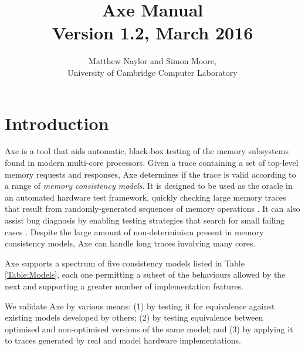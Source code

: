\documentclass[11pt]{article}
\begin{document}
\title{\textbf{Axe Manual}\\ {\large Version 1.2, March 2016}}
\author{Matthew Naylor and Simon Moore, \\
University of Cambridge Computer Laboratory}
\date{}
\maketitle

\tableofcontents

\newpage

\setlength{\parskip}{1em}
\renewcommand{\thefootnote}{\fnsymbol{footnote}}

\newcommand{\cmark}{\ding{51}}
\newcommand{\xmark}{\ding{55}}

\section{Introduction}

Axe is a tool that aids automatic, black-box testing of the
memory subsystems found in modern multi-core processors.  Given a
trace containing a set of top-level memory requests and responses, Axe
determines if the trace is valid according to a range of \emph{memory
consistency models}.  It is designed to be used as the oracle in an
automated hardware test framework, quickly checking large memory
traces that result from randomly-generated sequences of memory
operations \cite{BlueCheck}.
It can also assist bug diagnosis by enabling
testing strategies that search
for small failing cases \cite{BlueCheck}.
Despite
the large amount of non-determinism present in memory consistency
models, Axe can handle long traces involving many cores.

Axe supports a spectrum of five consistency models listed in Table
\ref{Table:Models}, each one permitting a subset of the behaviours
allowed by the next and supporting a greater number of implementation
features.

We validate Axe by various means: (1) by testing it for equivalence
against existing models developed by others; (2) by testing
equivalence between optimised and non-optimised versions of the same
model; and (3) by applying it to traces generated by real and model
hardware implementations.
\end{document}
